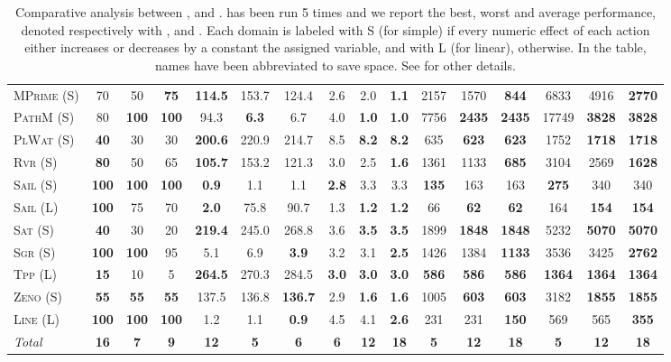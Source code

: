 \documentclass[11pt,landscape]{article}
\begin{document}
\begin{table*}[tb]
{\begin{tabular}{|l||ccc||ccc||ccc||ccc||ccc||}
\textsc{MPrime} (S)&70&50&\textbf{75}&\textbf{114.5}&153.7&124.4&2.6&2.0&\textbf{1.1}&2157&1570&\textbf{844}&6833&4916&\textbf{2770}\\
\textsc{PathM} (S)&80&\textbf{100}&\textbf{100}&94.3&\textbf{6.3}&6.7&4.0&\textbf{1.0}&\textbf{1.0}&7756&\textbf{2435}&\textbf{2435}&17749&\textbf{3828}&\textbf{3828}\\
\textsc{PlWat} (S)&\textbf{40}&30&30&\textbf{200.6}&220.9&214.7&8.5&\textbf{8.2}&\textbf{8.2}&635&\textbf{623}&\textbf{623}&1752&\textbf{1718}&\textbf{1718}\\
\textsc{Rvr} (S)&\textbf{80}&50&65&\textbf{105.7}&153.2&121.3&3.0&2.5&\textbf{1.6}&1361&1133&\textbf{685}&3104&2569&\textbf{1628}\\
\textsc{Sail} (S)&\textbf{100}&\textbf{100}&\textbf{100}&\textbf{0.9}&1.1&1.1&\textbf{2.8}&3.3&3.3&\textbf{135}&163&163&\textbf{275}&340&340\\
\textsc{Sail} (L)&\textbf{100}&75&70&\textbf{2.0}&75.8&90.7&1.3&\textbf{1.2}&\textbf{1.2}&66&\textbf{62}&\textbf{62}&164&\textbf{154}&\textbf{154}\\
\textsc{Sat} (S)&\textbf{40}&30&20&\textbf{219.4}&245.0&268.8&3.6&\textbf{3.5}&\textbf{3.5}&1899&\textbf{1848}&\textbf{1848}&5232&\textbf{5070}&\textbf{5070}\\
\textsc{Sgr} (S)&\textbf{100}&\textbf{100}&95&5.1&6.9&\textbf{3.9}&3.2&3.1&\textbf{2.5}&1426&1384&\textbf{1133}&3536&3425&\textbf{2762}\\
\textsc{Tpp} (L)&\textbf{15}&10&5&\textbf{264.5}&270.3&284.5&\textbf{3.0}&\textbf{3.0}&\textbf{3.0}&\textbf{586}&\textbf{586}&\textbf{586}&\textbf{1364}&\textbf{1364}&\textbf{1364}\\
\textsc{Zeno} (S)&\textbf{55}&\textbf{55}&\textbf{55}&137.5&136.8&\textbf{136.7}&2.9&\textbf{1.6}&\textbf{1.6}&1005&\textbf{603}&\textbf{603}&3182&\textbf{1855}&\textbf{1855}\\
\textsc{Line} (L)&\textbf{100}&\textbf{100}&\textbf{100}&1.2&1.1&\textbf{0.9}&4.5&4.1&\textbf{2.6}&231&231&\textbf{150}&569&565&\textbf{355}
\\\hline
\textit{Total}&\textbf{16}&\textbf{7}&\textbf{9}&\textbf{12}&\textbf{5}&\textbf{6}&\textbf{6}&\textbf{12}&\textbf{18}&\textbf{5}&\textbf{12}&\textbf{18}&\textbf{5}&\textbf{12}&\textbf{18}\\\hline

        \end{tabular}}
        \caption{Comparative analysis between  \pattyr, \pattya and \pattye. \pattyr has been run 5 times and we report the best, worst and average performance, denoted respectively with \pattyrmin, \pattyrmax and \pattyravg. Each domain is labeled with S (for simple) if every numeric effect of each action either increases or decreases by a constant the assigned variable, and with L (for linear), otherwise. In the table, names have been abbreviated to save space.  See \cite{ipc2023} for other details.}
        \label{tab:exp-random}
        \end{table*}
        
\end{document}
